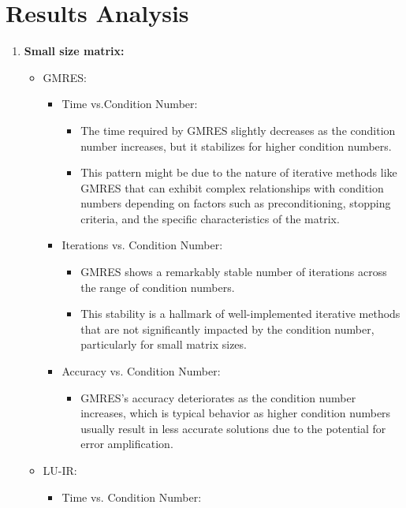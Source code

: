 \section{Results Analysis}
\begin{enumerate}
    \item \textbf{Small size matrix: }
    \begin{itemize}
        \item GMRES:
        \begin{itemize}
            \item Time vs.Condition Number:
            \begin{itemize}
                \item     The time required by GMRES slightly decreases as the condition number increases, but it stabilizes for higher condition numbers.
                \item This pattern might be due to the nature of iterative methods like GMRES that can exhibit complex relationships with condition numbers depending on factors such as preconditioning, stopping criteria, and the specific characteristics of the matrix.
            \end{itemize}
           \item Iterations vs. Condition Number:
           \begin{itemize}
               \item     GMRES shows a remarkably stable number of iterations across the range of condition numbers.
               \item This stability is a hallmark of well-implemented iterative methods that are not significantly impacted by the condition number, particularly for small matrix sizes.
           \end{itemize}
           \item Accuracy vs. Condition Number:
           \begin{itemize}
               \item GMRES's accuracy deteriorates as the condition number increases, which is typical behavior as higher condition numbers usually result in less accurate solutions due to the potential for error amplification.
           \end{itemize}   
        \end{itemize}
        \item LU-IR:
        \begin{itemize}
            \item Time vs. Condition Number:
            \begin{itemize}

\end{itemize}
\end{itemize}
\end{itemize}
\end{enumerate}

